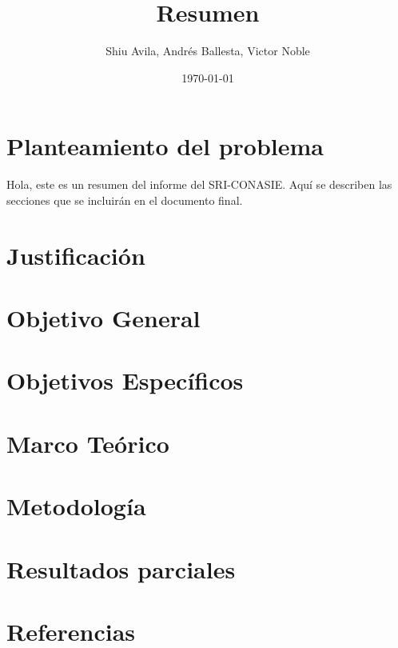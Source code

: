 \documentclass[12pt,a4paper]{article}
\title{Resumen}
\author{Shiu Avila, Andrés Ballesta, Victor Noble}
\date{\today}
\begin{document}
\maketitle

\section{Planteamiento del problema}

Hola, este es un resumen del informe del SRI-CONASIE. Aquí se describen las secciones que se incluirán en el documento final.

\section{Justificación}
\section{Objetivo General}
\section{Objetivos Específicos}
\section{Marco Teórico}
\section{Metodología}


\section{Resultados parciales}
\section{Referencias}
\end{document}
